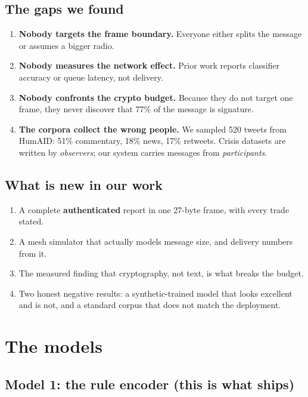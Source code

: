 \documentclass[11pt,a4paper]{article}
\begin{document}
\subsection{The gaps we found}

\begin{enumerate}
\item \textbf{Nobody targets the frame boundary.} Everyone either splits the
      message or assumes a bigger radio.
\item \textbf{Nobody measures the network effect.} Prior work reports
      classifier accuracy or queue latency, not delivery.
\item \textbf{Nobody confronts the crypto budget.} Because they do not target
      one frame, they never discover that 77\% of the message is signature.
\item \textbf{The corpora collect the wrong people.} We sampled 520 tweets
      from HumAID: 51\% commentary, 18\% news, 17\% retweets. Crisis datasets
      are written by \emph{observers}; our system carries messages from
      \emph{participants}.
\end{enumerate}

\subsection{What is new in our work}

\begin{enumerate}
\item A complete \textbf{authenticated} report in one 27-byte frame, with every
      trade stated.
\item A mesh simulator that actually models message size, and delivery numbers
      from it.
\item The measured finding that cryptography, not text, is what breaks the
      budget.
\item Two honest negative results: a synthetic-trained model that looks
      excellent and is not, and a standard corpus that does not match the
      deployment.
\end{enumerate}

\section{The models}

\subsection{Model 1: the rule encoder (this is what ships)}
\end{document}
